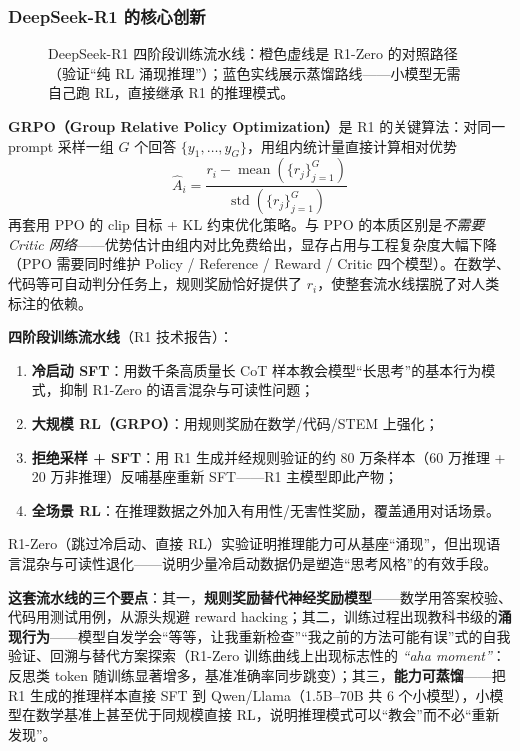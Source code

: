 \documentclass[12pt,a4paper]{article}
\begin{document}
\subsubsection{DeepSeek-R1 的核心创新}

\begin{figure}[htbp]
\centering

\caption{DeepSeek-R1 四阶段训练流水线：橙色虚线是 R1-Zero 的对照路径（验证“纯 RL 涌现推理”）；蓝色实线展示蒸馏路线——小模型无需自己跑 RL，直接继承 R1 的推理模式。}
\label{fig:r1}
\end{figure}

\textbf{GRPO（Group Relative Policy Optimization）}是 R1 的关键算法：对同一 prompt 采样一组 $G$ 个回答 $\{y_1, \ldots, y_G\}$，用组内统计量直接计算相对优势
\[
\hat{A}_i = \frac{r_i - \operatorname{mean}(\{r_j\}_{j=1}^G)}{\operatorname{std}(\{r_j\}_{j=1}^G)}
\]
再套用 PPO 的 clip 目标 + KL 约束优化策略。与 PPO 的本质区别是\emph{不需要 Critic 网络}——优势估计由组内对比免费给出，显存占用与工程复杂度大幅下降（PPO 需要同时维护 Policy / Reference / Reward / Critic 四个模型）。在数学、代码等可自动判分任务上，规则奖励恰好提供了 $r_i$，使整套流水线摆脱了对人类标注的依赖。

\textbf{四阶段训练流水线}（R1 技术报告）：
\begin{enumerate}
  \item \textbf{冷启动 SFT}：用数千条高质量长 CoT 样本教会模型“长思考”的基本行为模式，抑制 R1-Zero 的语言混杂与可读性问题；
  \item \textbf{大规模 RL（GRPO）}：用规则奖励在数学/代码/STEM 上强化；
  \item \textbf{拒绝采样 + SFT}：用 R1 生成并经规则验证的约 80 万条样本（60 万推理 + 20 万非推理）反哺基座重新 SFT——R1 主模型即此产物；
  \item \textbf{全场景 RL}：在推理数据之外加入有用性/无害性奖励，覆盖通用对话场景。
\end{enumerate}
R1-Zero（跳过冷启动、直接 RL）实验证明推理能力可从基座“涌现”，但出现语言混杂与可读性退化——说明少量冷启动数据仍是塑造“思考风格”的有效手段。

\textbf{这套流水线的三个要点}：其一，\textbf{规则奖励替代神经奖励模型}——数学用答案校验、代码用测试用例，从源头规避 reward hacking；其二，训练过程出现教科书级的\textbf{涌现行为}——模型自发学会“等等，让我重新检查”“我之前的方法可能有误”式的自我验证、回溯与替代方案探索（R1-Zero 训练曲线上出现标志性的 \emph{“aha moment”}：反思类 token 随训练显著增多，基准准确率同步跳变）；其三，\textbf{能力可蒸馏}——把 R1 生成的推理样本直接 SFT 到 Qwen/Llama（1.5B--70B 共 6 个小模型），小模型在数学基准上甚至优于同规模直接 RL，说明推理模式可以“教会”而不必“重新发现”。
\end{document}
